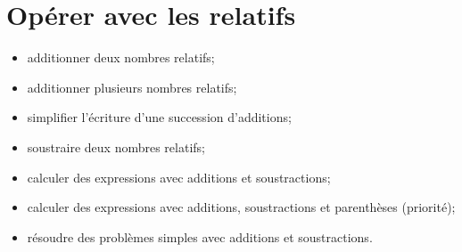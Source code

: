 \chapter{Opérer avec les relatifs}\label{ChOpererRelatifs}


\vspace{5cm}

\begin{acquis}
\begin{itemize}
\item additionner deux nombres relatifs;
\item additionner plusieurs nombres relatifs;
\item simplifier l’écriture d’une succession d’additions;
\item soustraire deux nombres relatifs;
\item calculer des expressions avec additions et soustractions;
\item calculer des expressions avec additions, soustractions et parenthèses (priorité);
\item résoudre des problèmes simples avec additions et soustractions.
\end{itemize}
\end{acquis}


\activites



\cours


\exercicesbase
\begin{colonne*exercice}

\end{colonne*exercice}


\exercicesappr
\begin{colonne*exercice}

\end{colonne*exercice}

\connaissances


%

\pagebreak

%


